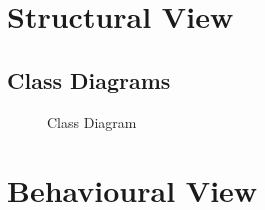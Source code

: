 \documentclass{report}
\begin{document}
\section{Structural View}
\subsection{Class Diagrams}
\begin{figure}[htp]
\href{https://www.canva.com/design/DAFfQlBz9aY/mV0XSkFn8OPFTq5QxdK9iw/view?utm_content=DAFfQlBz9aY&utm_campaign=designshare&utm_medium=link&utm_source=publishsharelink}{}
\caption{Class Diagram}
\end{figure}

\section{Behavioural View}
\end{document}
